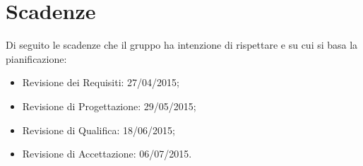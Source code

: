 \section{Scadenze}{
\label{sec:scadenze}
Di seguito le scadenze che il gruppo \gruppo ha intenzione di rispettare e su cui si basa la pianificazione:
\begin{itemize}
	\item Revisione dei Requisiti: 27/04/2015;
	\item Revisione di Progettazione: 29/05/2015;
	\item Revisione di Qualifica: 18/06/2015;
	\item Revisione di Accettazione: 06/07/2015.
\end{itemize}
}